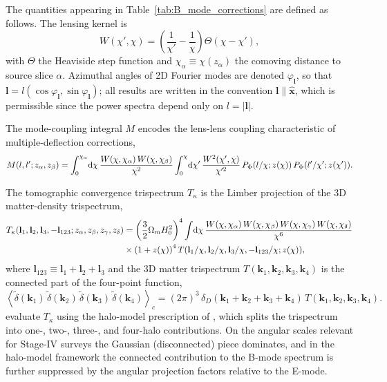 \documentclass[11pt]{book}
\DeclareRobustCommand{\d}{\ifmmode\text{d}\else d\fi}
\begin{document}
The quantities appearing in Table~\ref{tab:B_mode_corrections} are defined as follows. The lensing kernel is
\begin{equation}
    W(\chi', \chi) = \left( \frac{1}{\chi'} - \frac{1}{\chi} \right) \Theta(\chi - \chi'),
\end{equation}
with $\Theta$ the Heaviside step function and $\chi_\alpha \equiv \chi(z_\alpha)$ the comoving distance to source slice $\alpha$. Azimuthal angles of 2D Fourier modes are denoted $\varphi_{\mathbf{l}}$, so that $\mathbf{l} = l(\cos\varphi_{\mathbf{l}}, \sin\varphi_{\mathbf{l}})$; all results are written in the convention $\mathbf{l} \parallel \hat{\mathbf{x}}$, which is permissible since the power spectra depend only on $l = |\mathbf{l}|$.

The mode-coupling integral $M$ encodes the lens-lens coupling characteristic of multiple-deflection corrections,
\begin{equation}
    M(l, l'; z_\alpha, z_\beta) = \int_0^{\chi_\alpha} \!\d\chi\, \frac{W(\chi, \chi_\alpha)\, W(\chi, \chi_\beta)}{\chi^2} \int_0^{\chi} \!\d\chi'\, \frac{W^2(\chi', \chi)}{\chi'^2}\, P_\Phi(l/\chi; z(\chi))\, P_\Phi(l'/\chi'; z(\chi')).
\end{equation}

The tomographic convergence trispectrum $T_\kappa$ is the Limber projection of the 3D matter-density trispectrum,
\begin{align*}
    T_\kappa(\mathbf{l}_1, \mathbf{l}_2, \mathbf{l}_3, -\mathbf{l}_{123}; z_\alpha, z_\beta, z_\gamma, z_\delta) &= \left( \frac{3}{2} \Omega_m H_0^2 \right)^4 \int \!\d\chi\, \frac{W(\chi, \chi_\alpha)\, W(\chi, \chi_\beta)\, W(\chi, \chi_\gamma)\, W(\chi, \chi_\delta)}{\chi^6} \\\ 
    &\times\left(1 + z(\chi)\right)^4 T(\mathbf{l}_1/\chi, \mathbf{l}_2/\chi, \mathbf{l}_3/\chi, -\mathbf{l}_{123}/\chi; z(\chi)),
\end{align*}
where $\mathbf{l}_{123} \equiv \mathbf{l}_1 + \mathbf{l}_2 + \mathbf{l}_3$ and the 3D matter trispectrum $T(\mathbf{k}_1, \mathbf{k}_2, \mathbf{k}_3, \mathbf{k}_4)$ is the connected part of the four-point function,
\begin{equation}
    \left\langle \tilde{\delta}(\mathbf{k}_1)\, \tilde{\delta}(\mathbf{k}_2)\, \tilde{\delta}(\mathbf{k}_3)\, \tilde{\delta}(\mathbf{k}_4) \right\rangle_c = (2\pi)^3\, \delta_D(\mathbf{k}_1 + \mathbf{k}_2 + \mathbf{k}_3 + \mathbf{k}_4)\, T(\mathbf{k}_1, \mathbf{k}_2, \mathbf{k}_3, \mathbf{k}_4).
\end{equation}
\cite{Krause_2010} evaluate $T_\kappa$ using the halo-model prescription of \cite{2001ApJ...554...56C}, which splits the trispectrum into one-, two-, three-, and four-halo contributions. On the angular scales relevant for Stage-IV surveys the Gaussian (disconnected) piece dominates, and in the halo-model framework the connected contribution to the B-mode spectrum is further suppressed by the angular projection factors relative to the E-mode.
\end{document}
